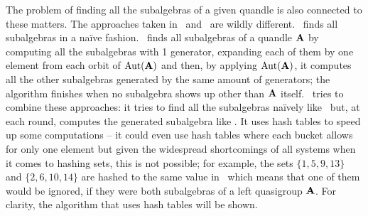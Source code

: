 \documentclass{mcom-l}
\begin{document}
\noindent The problem of finding all the subalgebras of a given quandle is also connected to these matters. The approaches taken in \rig~and \cream~are wildly different. \rig~finds all subalgebras in a naïve fashion. \cream~finds all subalgebras of a quandle $\mathbf{A}$ by computing all the subalgebras with 1 generator, expanding each of them by one element from each orbit of $\operatorname{Aut}(\mathbf{A})$ and then, by applying $\operatorname{Aut}(\mathbf{A})$, it computes all the other subalgebras generated by the same amount of generators; the algorithm finishes when no subalgebra shows up other than $\mathbf{A}$ itself. \Software~tries to combine these approaches: it tries to find all the subalgebras naïvely like \rig~but, at each round, computes the generated subalgebra like \cream. It uses hash tables to speed up some computations -- it could even use hash tables where each bucket allows for only one element but given the widespread shortcomings of all systems when it comes to hashing sets, this is not possible; for example, the sets $\{1, 5, 9, 13\}$ and $\{2,6,10,14\}$ are hashed to the same value in \magma~which means that one of them would be ignored, if they were both subalgebras of a left quasigroup $\mathbf{A}$. \newline For clarity, the algorithm that uses hash tables will be shown. \newline
\end{document}
